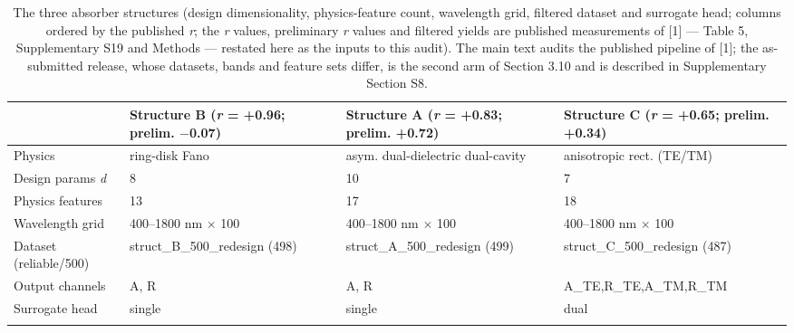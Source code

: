 \documentclass[11pt,a4paper]{article}
\begin{document}
\begin{table}[htbp]
\centering
\setlength{\tabcolsep}{2pt}\tiny
\caption{The three absorber structures (design dimensionality, physics-feature count, wavelength grid, filtered dataset and surrogate head; columns ordered by the published \emph{r}; the \emph{r} values, preliminary \emph{r} values and filtered yields are published measurements of {[}1{]} --- Table 5, Supplementary S19 and Methods --- restated here as the inputs to this audit). The main text audits the published pipeline of {[}1{]}; the as-submitted release, whose datasets, bands and feature sets differ, is the second arm of Section 3.10 and is described in Supplementary Section S8.}
\label{tab:1}
\begin{tabular}{@{}llll@{}}
\toprule\noalign{} & Structure B (\emph{r} = +0.96; prelim. \ensuremath{-}0.07) & Structure A (\emph{r} = +0.83; prelim. +0.72) & Structure C (\emph{r} = +0.65; prelim. +0.34) \\
\midrule\noalign{}
Physics & ring-disk Fano & asym. dual-dielectric dual-cavity & anisotropic rect. (TE/TM) \\
Design params \emph{d} & 8 & 10 & 7 \\
Physics features & 13 & 17 & 18 \\
Wavelength grid & 400--1800 nm \ensuremath{\times} 100 & 400--1800 nm \ensuremath{\times} 100 & 400--1800 nm \ensuremath{\times} 100 \\
Dataset (reliable/500) & struct\_B\_500\_redesign (498) & struct\_A\_500\_redesign (499) & struct\_C\_500\_redesign (487) \\
Output channels & A, R & A, R & A\_TE,R\_TE,A\_TM,R\_TM \\
Surrogate head & single & single & dual \\
\bottomrule\noalign{}
\end{tabular}
\end{table}
\end{document}
